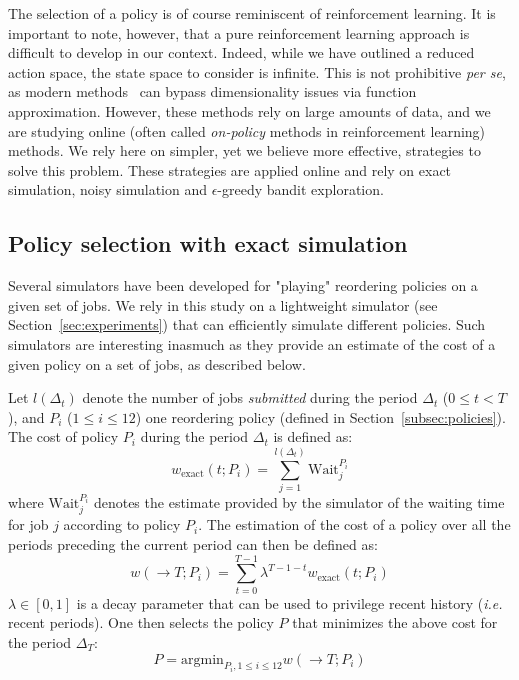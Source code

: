 \documentclass[sigconf,review,anonymous]{acmart}
\begin{document}
The selection of a policy is of course reminiscent of reinforcement learning.
It is important to note, however, that a pure reinforcement learning approach
is difficult to develop in our context. Indeed, while we have outlined a
reduced action space, the state space to consider is infinite. This is not
prohibitive \textit{per se}, as modern methods~\cite{aprl}
can bypass dimensionality issues via function approximation. However, these
methods rely on large amounts of data, and we are studying online (often called
\textit{on-policy} methods in reinforcement learning) methods. We rely here on
simpler, yet we believe more effective, strategies to solve this problem.
These strategies are applied online and rely on exact simulation, noisy
simulation and $\epsilon$-greedy bandit exploration.

\subsection{Policy selection with exact simulation}
\label{sub:feedback}

Several simulators have been developed for "playing" reordering policies on a
given set of jobs. We rely in this study on a lightweight simulator (see
Section~\ref{sec:experiments}) that can efficiently simulate different
policies. Such simulators are interesting inasmuch as they provide an estimate
of the cost of a given policy on a set of jobs, as described below.

Let $l(\Delta_t)$ denote the number of jobs \textit{submitted} during the
period $\Delta_t$ ($0 \le t < T$), and $P_i$ ($1 \le i \le 12$) one reordering
policy (defined in Section~\ref{subsec:policies}). The cost of policy $P_i$
during the period $\Delta_t$ is defined as:
%
\begin{equation} \label{eq:cost-exact} w_{\mbox{exact}}(t;P_i) =
\sum_{j=1}^{l(\Delta_t)} \mbox{Wait}_j^{P_i} \end{equation}
%
where $\mbox{Wait}_j^{P_i}$ denotes the estimate provided by the simulator of
the waiting time for job $j$ according to policy $P_i$. The estimation of the
cost of a policy over all the periods preceding the current period can then be
defined as:
%
\begin{equation} \label{eq:tot-cost-exact} w(\rightarrow T;P_i) =
\sum_{t=0}^{T-1} \lambda^{T-1-t} w_{\mbox{exact}}(t;P_i) \end{equation}
%
$\lambda \in [0,1]$ is a decay parameter that can be used to privilege recent
history (\textit{i.e.} recent periods). One then selects the policy $P$ that
minimizes the above cost for the period $\Delta_T$:
%
\begin{equation} \label{eq:select-exact} P = \mbox{argmin}_{P_i, 1 \le i \le
12} w(\rightarrow T;P_i) \end{equation}
\end{document}
